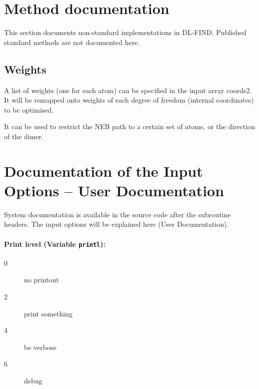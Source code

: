 \documentclass{article}
\begin{document}
\section{Method documentation}

This section documents non-standard implementations in DL-FIND. Published
standard methods are not documented here.

\subsection{Weights}

A list of weights (one for each atom) can be specified in the input array
coords2. It will be remapped onto weights of each degree of freedom (internal
coordinates) to be optimised.

It can be used to restrict the NEB path to a certain set of atoms, or the
direction of the dimer.


\section{Documentation of the Input Options -- User Documentation}

System documentation is available in the source code after the subroutine
headers. The input options will be explained here (User Documentation).

\paragraph{Print level (Variable \texttt{printl}):}
\begin{description}
\item[0] no printout
\item[2] print something
\item[4] be verbose
\item[6] debug
\end{description}
\end{document}
